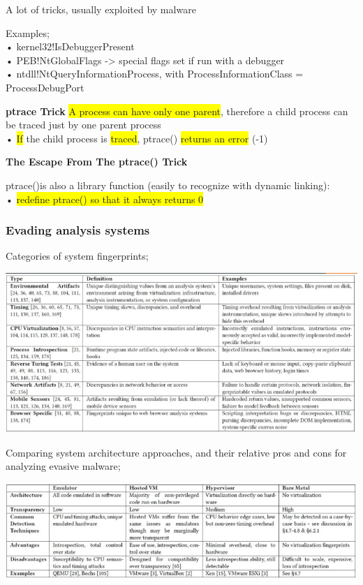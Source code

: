 \documentclass[]{project_plan}
\begin{document}
A lot of tricks, usually exploited by malware

Examples;\\
• kernel32!IsDebuggerPresent\\
• PEB!NtGlobalFlags -> special flags set if run with a debugger\\
• ntdll!NtQueryInformationProcess, with ProcessInformationClass = ProcessDebugPort

\textbf{ptrace Trick}
\colorbox{yellow}{A process can have only one parent}, therefore a child process can be traced just by one parent
process\\
• \colorbox{yellow}{If} the child process is \colorbox{yellow}{traced}, ptrace() \colorbox{yellow}{returns an error} (-1)

\textbf{The Escape From The ptrace() Trick}

ptrace()is also a library function (easily to recognize with dynamic linking):\\
• \colorbox{yellow}{redefine ptrace() so that it always returns 0}

\subsubsection{Evading analysis systems}

Categories of system fingerprints;

\includegraphics[width=\linewidth]{fingerprints.png}

Comparing system architecture approaches, and their relative pros and cons for
analyzing evasive malware;

\includegraphics[width=\linewidth]{system arch.png}
\end{document}
